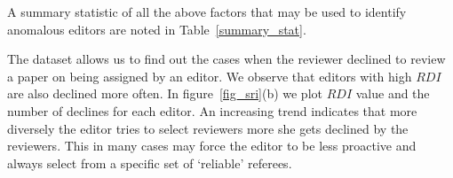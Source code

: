 A summary statistic of all the above factors that may be used to identify anomalous editors are noted in Table~\ref{summary_stat}.

The dataset allows us to find out the cases when the reviewer declined to review a paper on being assigned by an editor. We observe that editors with high $RDI$ are also declined more often. In figure~\ref{fig_sri}(b) we plot $RDI$ value and the number of declines for each editor. An increasing trend indicates that more diversely the editor tries to select reviewers more she gets declined by the reviewers. This in many cases may force the editor to be less proactive and always select from a specific set of `reliable' referees.  


